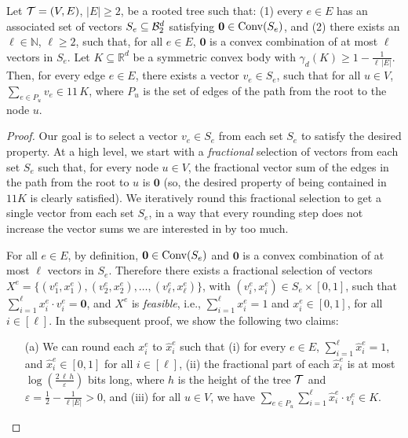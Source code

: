 \begin{theorem}\label{theorem:tree-reduction}
 Let $\mathcal{T} = (V,E)$, $|E| \geq 2$, be a rooted tree such that: (1) every $e \in E$ has an associated set of vectors $S_e \subseteq \mathcal{B}^d_2$ satisfying $\mathbf{0} \in \mathrm{Conv}(S_e)$, and (2) there exists an $\ell \in \mathbb{N}$, $\ell \geq 2$, such that, for all $e \in E$, $\mathbf{0}$ is a convex combination of at most $\ell$ vectors in $S_e$. Let $K \subseteq \mathbb{R}^d$ be a symmetric convex body with $\gamma_d(K) \geq 1 - \frac{1}{\ell\, |E|}$. Then, for every edge $e \in E$, there exists a vector $v_e \in S_e$, such that for all $u \in V$, $\sum_{e \in P_u} v_e \in 11 \, K$, where $P_u$ is the set of edges of the path from the root to the node $u$.
\end{theorem}
\begin{proof}
    Our goal is to select a vector $v_e \in S_e$ from each set $S_e$ to satisfy the desired property. At a high level, we start with a \emph{fractional} selection of vectors from each set $S_e$ such that, for every node $u \in V$, the fractional vector sum of the edges in the path from the root to $u$ is $\mathbf{0}$ (so, the desired property of being contained in $11 K$ is clearly satisfied). We iteratively round this fractional selection to get a single vector from each set $S_e$, in a way that every rounding step does not increase the vector sums we are interested in by too much.


    For all $e \in E$, by definition, $\mathbf{0} \in \mathrm{Conv}(S_e)$ and $\mathbf{0}$ is a convex combination of at most $\ell$ vectors in $S_e$. %
    Therefore there exists a fractional selection of vectors $X^e = \{(v^e_1,x^e_1), (v^e_2,x^e_2), \ldots, (v^e_{\ell},x^e_{\ell})\}$, with $(v^e_i,x^e_i) \in S_e \times [0,1]$, such that $\sum_{i=1}^{\ell} x^e_{i} \cdot v^e_i = \mathbf{0}$, and $X^e$ is \emph{feasible}, i.e., $\sum_{i=1}^{\ell} x^e_{i} = 1$ and $x^e_i \in [0,1]$, for all $i \in [\ell]$. In the subsequent proof, we show the following two claims:
    \begin{enumerate}
        \item [(a)] 
            We can round each $x^e_i$ to $\hat{x}^e_i$ such that (i) for every $e \in E$, $\sum_{i=1}^{\ell} \hat{x}^e_i = 1$, and $\hat{x}^e_i \in [0,1]$ for all $i\in [\ell]$, (ii) the fractional part of each $\hat{x}^e_i$ is at most $\log(\frac{2 \, \ell \, h}{\varepsilon})$ bits long, where $h$ is the height of the tree $\mathcal{T}$ and $\varepsilon = \frac{1}{2}-\frac{1}{\ell |E|}  > 0$, and (iii) for all $u \in V$, we have $\sum_{e \in P_u} \sum_{i=1}^{\ell} \hat{x}^e_i \cdot v^e_i \in K$.
        

\end{enumerate}
\end{proof}
